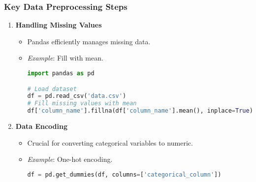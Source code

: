 \documentclass[aspectratio=169]{beamer}
\begin{document}
\begin{frame}[fragile]
    \frametitle{Key Data Preprocessing Steps}
    \begin{enumerate}
        \item \textbf{Handling Missing Values}
        \begin{itemize}
            \item Pandas efficiently manages missing data.
            \item \textit{Example}: Fill with mean.
            \begin{lstlisting}[language=Python]
import pandas as pd

# Load dataset
df = pd.read_csv('data.csv')
# Fill missing values with mean
df['column_name'].fillna(df['column_name'].mean(), inplace=True)
            \end{lstlisting}
        \end{itemize}
        
        \item \textbf{Data Encoding}
        \begin{itemize}
            \item Crucial for converting categorical variables to numeric.
            \item \textit{Example}: One-hot encoding.
            \begin{lstlisting}[language=Python]
df = pd.get_dummies(df, columns=['categorical_column'])
            \end{lstlisting}
        \end{itemize}
    \end{enumerate}
\end{frame}
\end{document}
